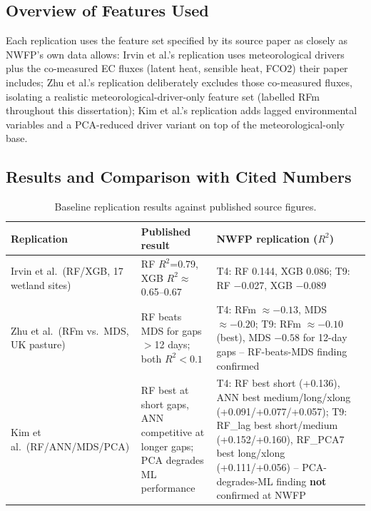 \subsection{Overview of Features Used}

Each replication uses the feature set specified by its source paper as closely as NWFP's own data
allows: Irvin et al.'s replication uses meteorological drivers plus the co-measured EC fluxes
(latent heat, sensible heat, FCO2) their paper includes; Zhu et al.'s replication deliberately
excludes those co-measured fluxes, isolating a realistic meteorological-driver-only feature set
(labelled RFm throughout this dissertation); Kim et al.'s replication adds lagged environmental
variables and a PCA-reduced driver variant on top of the meteorological-only base.

\subsection{Results and Comparison with Cited Numbers}

\begin{table}[h]
\centering
\footnotesize
\begin{tabular}{lp{5cm}p{5cm}}
\toprule
Replication & Published result & NWFP replication ($R^2$) \\
\midrule
Irvin et al.\ (RF/XGB, 17 wetland sites) & RF $R^2$=0.79, XGB $R^2\approx$0.65--0.67 &
T4: RF 0.144, XGB 0.086; T9: RF $-$0.027, XGB $-$0.089 \\
Zhu et al.\ (RFm vs.\ MDS, UK pasture) & RF beats MDS for gaps $>$12 days; both $R^2<0.1$ &
T4: RFm $\approx-0.13$, MDS $\approx-0.20$; T9: RFm $\approx-0.10$ (best), MDS $-0.58$ for 12-day
gaps -- RF-beats-MDS finding confirmed \\
Kim et al.\ (RF/ANN/MDS/PCA) & RF best at short gaps, ANN competitive at longer gaps; PCA
degrades ML performance & T4: RF best short (+0.136), ANN best medium/long/xlong
(+0.091/+0.077/+0.057); T9: RF\_lag best short/medium (+0.152/+0.160), RF\_PCA7 best long/xlong
(+0.111/+0.056) -- PCA-degrades-ML finding \textbf{not} confirmed at NWFP \\
\bottomrule
\end{tabular}
\caption{Baseline replication results against published source figures.}
\end{table}

